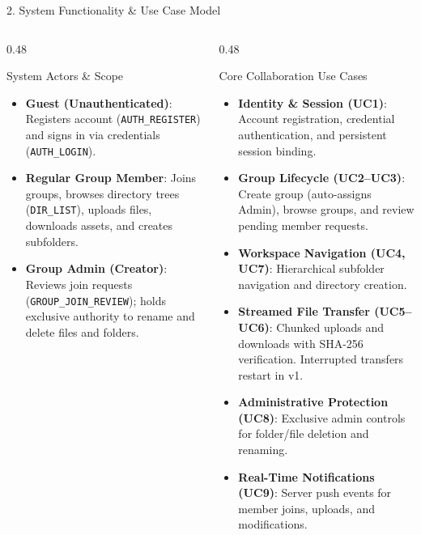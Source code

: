 \documentclass[t, aspectratio=169]{beamer}
\begin{document}
\begin{frame}{2. System Functionality \& Use Case Model}
\small
\begin{columns}[T]
\begin{column}{0.48\textwidth}
\begin{block}{System Actors \& Scope}
\scriptsize
\begin{itemize}
    \setlength{\itemsep}{4pt}
    \item \textbf{Guest (Unauthenticated)}: Registers account (\texttt{AUTH\_REGISTER}) and signs in via credentials (\texttt{AUTH\_LOGIN}).
    \item \textbf{Regular Group Member}: Joins groups, browses directory trees (\texttt{DIR\_LIST}), uploads files, downloads assets, and creates subfolders.
    \item \textbf{Group Admin (Creator)}: Reviews join requests (\texttt{GROUP\_JOIN\_REVIEW}); holds exclusive authority to rename and delete files and folders.
\end{itemize}
\end{block}
\end{column}

\begin{column}{0.48\textwidth}
\begin{block}{Core Collaboration Use Cases}
\scriptsize
\begin{itemize}
    \setlength{\itemsep}{2pt}
    \item \textbf{Identity \& Session (UC1)}: Account registration, credential authentication, and persistent session binding.
    \item \textbf{Group Lifecycle (UC2--UC3)}: Create group (auto-assigns Admin), browse groups, and review pending member requests.
    \item \textbf{Workspace Navigation (UC4, UC7)}: Hierarchical subfolder navigation and directory creation.
    \item \textbf{Streamed File Transfer (UC5--UC6)}: Chunked uploads and downloads with SHA-256 verification. Interrupted transfers restart in v1.
    \item \textbf{Administrative Protection (UC8)}: Exclusive admin controls for folder/file deletion and renaming.
    \item \textbf{Real-Time Notifications (UC9)}: Server push events for member joins, uploads, and modifications.
\end{itemize}
\end{block}
\end{column}
\end{columns}
\end{frame}
\end{document}

